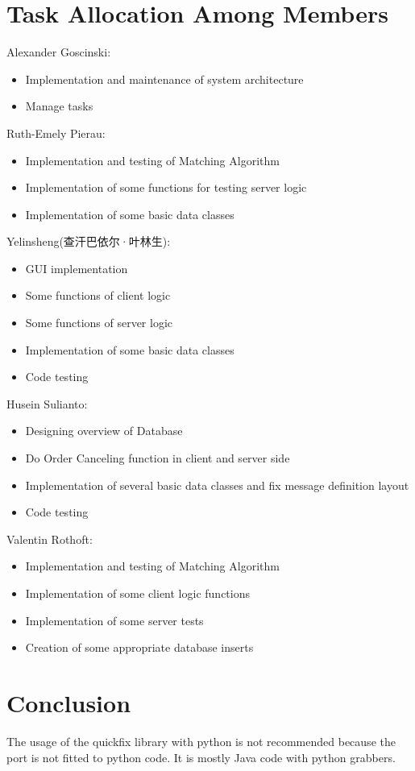 \documentclass[a4paper, 11pt]{article}
\begin{document}
\section*{Task Allocation Among Members}

Alexander Goscinski:
\begin{itemize}
  \item Implementation and maintenance of system architecture
  \item Manage tasks
\end{itemize}
Ruth-Emely Pierau:
\begin{itemize}
	\item Implementation and testing of Matching Algorithm
	\item Implementation of some functions for testing server logic
	\item Implementation of some basic data classes
\end{itemize}
Yelinsheng(查汗巴依尔·叶林生):
\begin{itemize}
  \item GUI implementation
  \item Some functions of client logic
  \item Some functions of server logic
  \item Implementation of some basic data classes
  \item Code testing
\end{itemize}
Husein Sulianto:
\begin{itemize}
  \item Designing overview of Database
  \item Do Order Canceling function in client and server side
  \item Implementation of several basic data classes and fix message definition layout
  \item Code testing
\end{itemize}
Valentin Rothoft:
\begin{itemize}
  \item Implementation and testing of Matching Algorithm
  \item Implementation of some client logic functions
  \item Implementation of some server tests
  \item Creation of some appropriate database inserts
\end{itemize}

\section*{Conclusion}
The usage of the quickfix library with python is not recommended because the port is not fitted to python code. It is mostly Java code with python grabbers.
\end{document}

